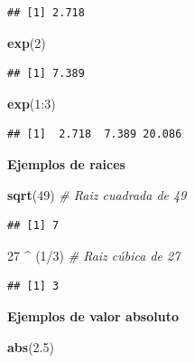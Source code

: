 \documentclass[10pt,]{krantz}
\makeatletter
\newenvironment{Shaded}{\begin{snugshade}}{\end{snugshade}}
\newcommand{\KeywordTok}[1]{\textcolor[rgb]{0.13,0.29,0.53}{\textbf{{#1}}}}
\newcommand{\DecValTok}[1]{\textcolor[rgb]{0.00,0.00,0.81}{{#1}}}
\newcommand{\FloatTok}[1]{\textcolor[rgb]{0.00,0.00,0.81}{{#1}}}
\newcommand{\StringTok}[1]{\textcolor[rgb]{0.31,0.60,0.02}{{#1}}}
\newcommand{\CommentTok}[1]{\textcolor[rgb]{0.56,0.35,0.01}{\textit{{#1}}}}
\newcommand{\NormalTok}[1]{{#1}}
\newenvironment{kframe}{%
\medskip{}
\setlength{\fboxsep}{.8em}
 \def\at@end@of@kframe{}%
 \ifinner\ifhmode%
  \def\at@end@of@kframe{\end{minipage}}%
  \begin{minipage}{\columnwidth}%
 \fi\fi%
 \def\FrameCommand##1{\hskip\@totalleftmargin \hskip-\fboxsep
 \colorbox{shadecolor}{##1}\hskip-\fboxsep
     \hskip-\linewidth \hskip-\@totalleftmargin \hskip\columnwidth}%
 \MakeFramed {\advance\hsize-\width
   \@totalleftmargin\z@ \linewidth\hsize
   \@setminipage}}%
 {\par\unskip\endMakeFramed%
 \at@end@of@kframe}
\renewenvironment{Shaded}{\begin{kframe}}{\end{kframe}}
\makeatother
\begin{document}
\begin{verbatim}
## [1] 2.718
\end{verbatim}

\begin{Shaded}
\begin{Highlighting}[]
\KeywordTok{exp}\NormalTok{(}\DecValTok{2}\NormalTok{)}
\end{Highlighting}
\end{Shaded}

\begin{verbatim}
## [1] 7.389
\end{verbatim}

\begin{Shaded}
\begin{Highlighting}[]
\KeywordTok{exp}\NormalTok{(}\DecValTok{1}\NormalTok{:}\DecValTok{3}\NormalTok{)}
\end{Highlighting}
\end{Shaded}

\begin{verbatim}
## [1]  2.718  7.389 20.086
\end{verbatim}

\textbf{Ejemplos de raices}

\begin{Shaded}
\begin{Highlighting}[]
\KeywordTok{sqrt}\NormalTok{(}\DecValTok{49}\NormalTok{)  }\CommentTok{# Raiz cuadrada de 49}
\end{Highlighting}
\end{Shaded}

\begin{verbatim}
## [1] 7
\end{verbatim}

\begin{Shaded}
\begin{Highlighting}[]
\DecValTok{27} \NormalTok{^}\StringTok{ }\NormalTok{(}\DecValTok{1}\NormalTok{/}\DecValTok{3}\NormalTok{)  }\CommentTok{# Raiz cúbica de 27}
\end{Highlighting}
\end{Shaded}

\begin{verbatim}
## [1] 3
\end{verbatim}

\textbf{Ejemplos de valor absoluto}

\begin{Shaded}
\begin{Highlighting}[]
\KeywordTok{abs}\NormalTok{(}\FloatTok{2.5}\NormalTok{)}
\end{Highlighting}
\end{Shaded}
\end{document}
